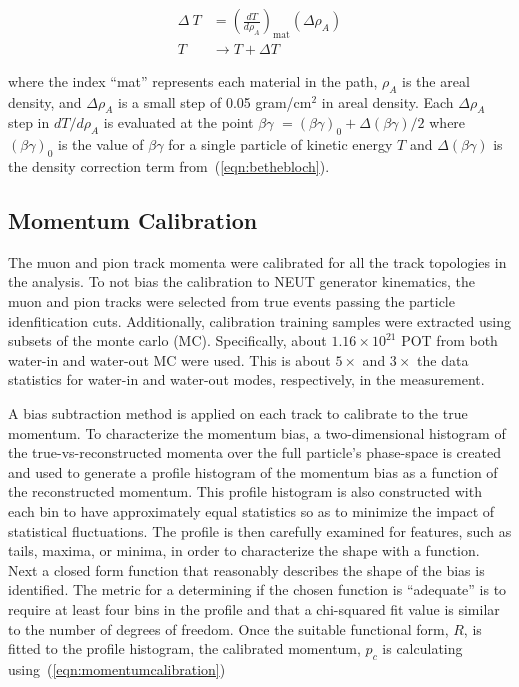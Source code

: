 \begin{align*}
    \Delta~T &= {\left(\frac{dT}{d\rho_{A}}\right)}_\text{mat} {\left(\Delta\rho_{A}\right)}\\
    T &\rightarrow T+\Delta T \,
\end{align*}

\noindent{}where the index ``mat'' represents each material in the path,
$\rho_{A}$ is the areal density, and $\Delta\rho_{A}$ is a
small step of 0.05 gram/cm$^2$ in areal density. Each $\Delta\rho_{A}$ step in $dT/d\rho_{A}$ is
evaluated at the point $\beta\gamma$ $= {(\beta\gamma)}_0 +
\Delta(\beta\gamma)/2$ where ${(\beta\gamma)}_0$ is the value of $\beta\gamma$
for a single particle of kinetic energy $T$ and $\Delta(\beta\gamma)$ is the density correction term from~(\ref{eqn:bethebloch}).

\subsection{Momentum Calibration}\label{subsec:MomToolSubsamples}

The muon and pion track momenta were calibrated for all the track topologies in the analysis.
To not bias the calibration to NEUT generator kinematics,
the muon and pion tracks were selected from true events passing the particle idenfitication cuts.
Additionally, calibration training samples were extracted using subsets of the monte carlo (MC). Specifically,
about $1.16\times10^{21}$ POT from both water-in and water-out MC were used.
This is about $5\times$ and $3\times$ the data statistics for water-in and water-out modes, respectively, in the measurement.

A bias subtraction method is applied on each track to calibrate to the true
momentum. To characterize the momentum bias, a two-dimensional
histogram of the true-vs-reconstructed momenta over the full
particle's phase-space is created and used to generate a profile
histogram of the momentum bias as a function of the reconstructed
momentum. This profile histogram is also constructed with each bin to
have approximately equal statistics so as to minimize the impact of
statistical fluctuations. The profile is then carefully examined for
features, such as tails, maxima, or minima, in order to characterize
the shape with a function. Next a closed form function that reasonably describes
the shape of the bias is identified. The metric for a determining if
the chosen function is ``adequate'' is to require at least four bins in
the profile and that a chi-squared fit value is similar to the number of degrees of freedom.
Once the suitable functional form, $R$, is fitted to the profile
histogram, the calibrated momentum, $p_c$ is calculating using~(\ref{eqn:momentumcalibration})

